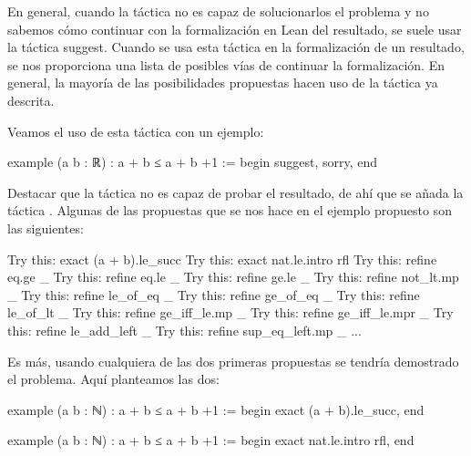 En general, cuando la táctica  no es
capaz de solucionarlos el problema y no sabemos cómo continuar con la
formalización en Lean del resultado, se suele usar la táctica 
{suggest}. Cuando se usa esta táctica en la formalización de un resultado, se
nos proporciona una lista de posibles vías de continuar la formalización. En
general, la mayoría de las posibilidades propuestas hacen uso de la táctica
 ya descrita.

Veamos el uso de esta táctica con un ejemplo:

\begin{leancode}
example (a b : ℝ) : a + b ≤ a + b +1 :=
begin
  suggest,
  sorry,
end
\end{leancode}

Destacar que la táctica  no es capaz de probar el
resultado, de ahí que se añada la táctica . Algunas de
las propuestas que se nos hace en el ejemplo propuesto son las siguientes:

\begin{leancode}
Try this: exact (a + b).le_succ
Try this: exact nat.le.intro rfl
Try this: refine eq.ge _
Try this: refine eq.le _
Try this: refine ge.le _
Try this: refine not_lt.mp _
Try this: refine le_of_eq _
Try this: refine ge_of_eq _
Try this: refine le_of_lt _
Try this: refine ge_iff_le.mp _
Try this: refine ge_iff_le.mpr _
Try this: refine le_add_left _
Try this: refine sup_eq_left.mp _
...
\end{leancode}

Es más, usando cualquiera de las dos primeras propuestas se tendría demostrado
el problema. Aquí planteamos las dos:

\begin{leancode}
example (a b : ℕ) : a + b ≤ a + b +1 :=
begin
  exact (a + b).le_succ,
end

example (a b : ℕ) : a + b ≤ a + b +1 :=
begin
  exact nat.le.intro rfl,
end
\end{leancode}

